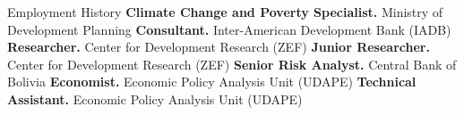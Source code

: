\begin{rubric}{Employment History}
%
	\textbf{Climate Change and Poverty Specialist.} Ministry of Development Planning
%
%
\entry*[2019]%
	\textbf{Consultant.} Inter-American Development Bank (IADB)
\entry*[2018]%
	\textbf{Researcher.} Center for Development Research (ZEF)
\entry*[2014 -- 2017]%
	\textbf{Junior Researcher.} Center for Development Research (ZEF)
\entry*[2013 -- 2014]%
	\textbf{Senior Risk Analyst.} Central Bank of Bolivia
\entry*[2007 -- 2011]%
	\textbf{Economist.} Economic Policy Analysis Unit (UDAPE)
\entry*[2004 -- 2005]%
	\textbf{Technical Assistant.} Economic Policy Analysis Unit (UDAPE)
	
	
	
	
	
	
	
	
%
\end{rubric}